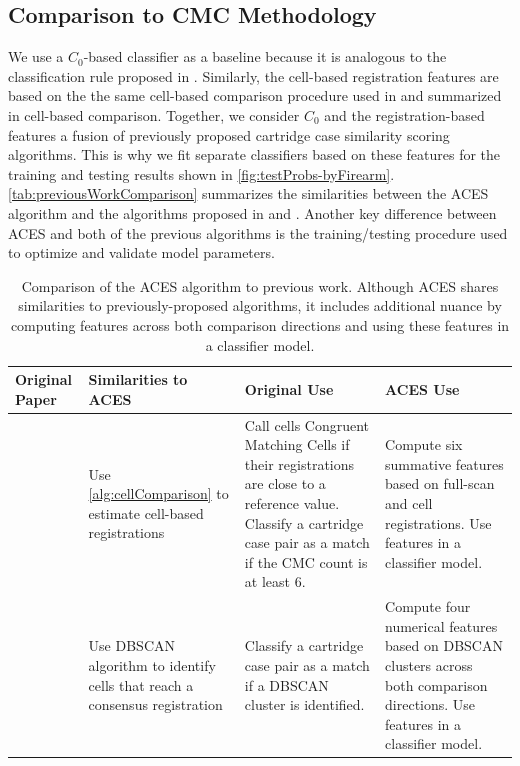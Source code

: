 \documentclass[reprint]{JASA}
\begin{document}
\hypertarget{comparison-to-cmc-methodology}{%
\subsection{Comparison to CMC
Methodology}\label{comparison-to-cmc-methodology}}

We use a \(C_0\)-based classifier as a baseline because it is analogous
to the classification rule proposed in \citet{zhang_convergence_2021}.
Similarly, the cell-based registration features are based on the the
same cell-based comparison procedure used in \citet{song_proposed_2013}
and summarized in cell-based comparison. Together, we consider \(C_0\)
and the registration-based features a fusion of previously proposed
cartridge case similarity scoring algorithms. This is why we fit
separate classifiers based on these features for the training and
testing results shown in \autoref{fig:testProbs-byFirearm}.
\autoref{tab:previousWorkComparison} summarizes the similarities between
the ACES algorithm and the algorithms proposed in
\citet{zhang_convergence_2021} and \citet{song_proposed_2013}. Another
key difference between ACES and both of the previous algorithms is the
training/testing procedure used to optimize and validate model
parameters.

\begin{table}[htbp]
\centering
\begin{tabular}{p{.18\linewidth} p{.23\linewidth} p{.23\linewidth} p{.23\linewidth}}
Original Paper & Similarities to ACES & Original Use & ACES Use \\
\hline
\citet{song_proposed_2013} & Use \autoref{alg:cellComparison} to estimate cell-based registrations & Call cells Congruent Matching Cells if their registrations are close to a reference value. Classify a cartridge case pair as a match if the CMC count is at least 6. & Compute six summative features based on full-scan and cell registrations. Use features in a classifier model. \\
\hline
\citet{zhang_convergence_2021} & Use DBSCAN algorithm to identify cells that reach a consensus registration & Classify a cartridge case pair as a match if a DBSCAN cluster is identified. & Compute four numerical features based on DBSCAN clusters across both comparison directions. Use features in a classifier model.
\end{tabular}
\caption{Comparison of the ACES algorithm to previous work. Although ACES shares similarities to previously-proposed algorithms, it includes additional nuance by computing features across both comparison directions and using these features in a classifier model.}
\label{tab:previousWorkComparison}
\end{table}
\end{document}
